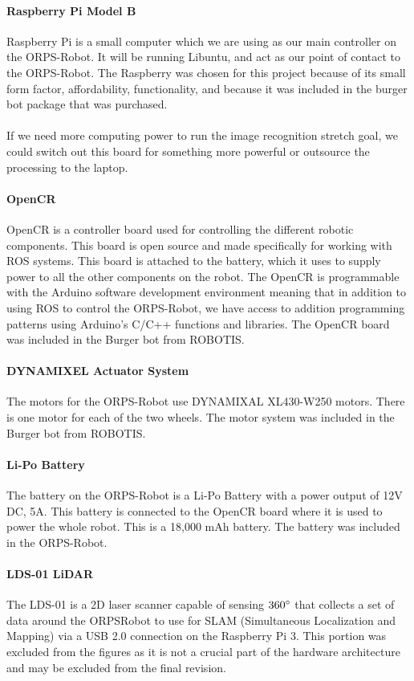 \documentclass[english,12pt]{article}
\begin{document}
\paragraph{Raspberry Pi Model B}
Raspberry Pi is a small computer which we are using as our main controller on the ORPS-Robot. It will be
running Libuntu, and act as our point of contact to the ORPS-Robot. The Raspberry was chosen for this
project because of its small form factor, affordability, functionality, and because it was included in the
burger bot package that was purchased.\\\\
If we need more computing power to run the image recognition stretch goal, we could switch out this
board for something more powerful or outsource the processing to the laptop.
\paragraph{OpenCR}
OpenCR is a controller board used for controlling the different robotic components. This board is open
source and made specifically for working with ROS systems. This board is attached to the battery, which
it uses to supply power to all the other components on the robot. The OpenCR is programmable with
the Arduino software development environment meaning that in addition to using ROS to control the
ORPS-Robot, we have access to addition programming patterns using Arduino’s C/C++ functions and
libraries. The OpenCR board was included in the Burger bot from ROBOTIS.
\paragraph{DYNAMIXEL Actuator System}
The motors for the ORPS-Robot use DYNAMIXAL XL430-W250 motors. There is one motor for each of
the two wheels. The motor system was included in the Burger bot from ROBOTIS.
\paragraph{Li-Po Battery}
The battery on the ORPS-Robot is a Li-Po Battery with a power output of 12V DC, 5A. This battery is
connected to the OpenCR board where it is used to power the whole robot. This is a 18,000 mAh
battery. The battery was included in the ORPS-Robot.
\paragraph{LDS-01 LiDAR}
The LDS-01 is a 2D laser scanner capable of sensing $360\degree$ that collects a set of data around the ORPSRobot
to use for SLAM (Simultaneous Localization and Mapping) via a USB 2.0 connection on the
Raspberry Pi 3. This portion was excluded from the figures as it is not a crucial part of the hardware
architecture and may be excluded from the final revision.
\end{document}
